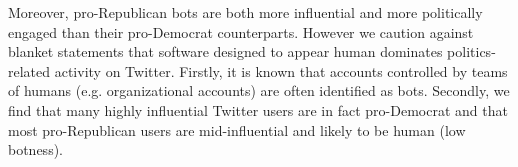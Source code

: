Moreover, pro-Republican bots are both more influential and more politically engaged than their pro-Democrat counterparts.
However we caution against blanket statements that software designed to appear human dominates politics-related activity on Twitter.
Firstly, it is known that accounts controlled by teams of humans (e.g. organizational accounts) are often identified as bots.
Secondly, we find that many highly influential Twitter users are in fact pro-Democrat and that most pro-Republican users are mid-influential and likely to be human (low botness).
